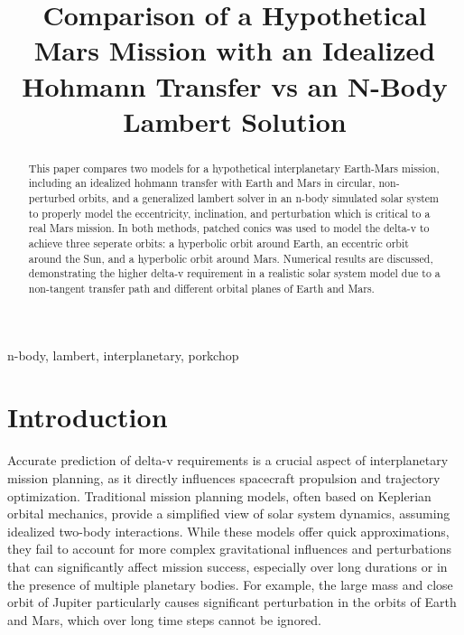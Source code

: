 \documentclass[conference]{IEEEtran}
\begin{document}
	
	\title{Comparison of a Hypothetical Mars Mission with an Idealized Hohmann Transfer vs an N-Body Lambert Solution }
	
	\author{
	}
	
	\maketitle
	
	\begin{abstract}
		This paper compares two models for a hypothetical interplanetary Earth-Mars mission, including an idealized hohmann transfer with Earth and Mars in circular, non-perturbed orbits, and a generalized lambert solver in an n-body simulated solar system to properly model the eccentricity, inclination, and perturbation which is critical to a real Mars mission. In both methods, patched conics was used to model the delta-v to achieve three seperate orbits: a hyperbolic orbit around Earth, an eccentric orbit around the Sun, and a hyperbolic orbit around Mars. Numerical results are discussed, demonstrating the higher delta-v requirement in a realistic solar system model due to a non-tangent transfer path and different orbital planes of Earth and Mars.
	\end{abstract}
	
	\begin{IEEEkeywords}
		n-body, lambert, interplanetary, porkchop
	\end{IEEEkeywords}
	
	\section{Introduction}
	Accurate prediction of delta-v requirements is a crucial aspect of interplanetary mission planning, as it directly influences spacecraft propulsion and trajectory optimization. Traditional mission planning models, often based on Keplerian orbital mechanics, provide a simplified view of solar system dynamics, assuming idealized two-body interactions. While these models offer quick approximations, they fail to account for more complex gravitational influences and perturbations that can significantly affect mission success, especially over long durations or in the presence of multiple planetary bodies. For example, the large mass and close orbit of Jupiter particularly causes significant perturbation in the orbits of Earth and Mars, which over long time steps cannot be ignored.\\
	
\end{document}
